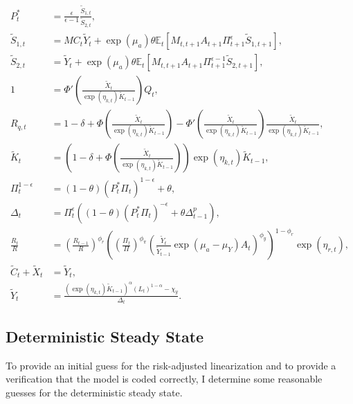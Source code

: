 \documentclass[12 pt, oneside]{article}
\theoremstyle{definition}
\theoremstyle{definition}
\theoremstyle{definition}
\newcommand{\E}{\mathbb{E}}
\begin{document}
\begin{align}
  P_t^* & = \frac{\epsilon}{\epsilon - 1}\frac{\tilde{S}_{1, t}}{\tilde{S}_{2, t}},\\
  \label{eq:numerator recursion eqm stat}
  \tilde{S}_{1, t} & = MC_t \tilde{Y}_t + \exp(\mu_a)\theta\E_t[M_{t, t + 1}A_{t + 1}\Pi_{t + 1}^\epsilon \tilde{S}_{1, t + 1}],\\
  \label{eq:denominator recursion eqm stat}
  \tilde{S}_{2, t} & = \tilde{Y}_t + \exp(\mu_a)\theta\E_t[M_{t, t + 1}A_{t + 1}\Pi_{t + 1}^{\epsilon - 1} \tilde{S}_{2, t + 1}],\\
  \label{eq:tobins q eqm stat}
  1 & = \Phi'\left(\frac{\tilde{X}_t}{\exp(\eta_{k, t})\tilde{K}_{t - 1}}\right) Q_t,\\
  \label{eq:Rq defn eqm stat}
  R_{q, t} & = 1 - \delta + \Phi\left(\frac{\tilde{X}_t}{\exp(\eta_{k, t})\tilde{K}_{t - 1}}\right) - \Phi'\left(\frac{\tilde{X}_t}{\exp(\eta_{k, t})\tilde{K}_{t - 1}}\right)\frac{\tilde{X}_t}{\exp(\eta_{k, t})\tilde{K}_{t - 1}},\\
  \label{eq:law of motion capital eqm stat}
  \tilde{K}_t & = \left(1 - \delta + \Phi\left(\frac{\tilde{X}_t}{\exp(\eta_{k, t})\tilde{K}_{t - 1}}\right)\right)\exp(\eta_{k, t})\tilde{K}_{t - 1},\\
  \label{eq:inflation from optimal reset price eqm stat}
  \Pi_t^{ 1 - \epsilon} & = (1 - \theta) (P_t^*\Pi_t)^{1 - \epsilon} + \theta,\\
  \label{eq:price dispersion evol eqm stat}
  \Delta_t & = \Pi_t^{\epsilon}((1 - \theta) (P_t^* \Pi_t)^{-\epsilon} + \theta \Delta_{t - 1}^p),\\
  \label{eq:taylor rule eqm stat}
  \frac{R_t}{R} & =  \left(\frac{R_{t - 1}}{R}\right)^{\phi_r}\left(\left(\frac{\Pi_t}{\Pi}\right)^{\phi_\pi}\left(\frac{\tilde{Y}_t}{\tilde{Y}_{t - 1}} \exp(\mu_a - \mu_Y)A_t\right)^{\phi_y}\right)^{1 - \phi_r}\exp(\eta_{r, t}),\\
  \label{eq:output market clearing eqm stat}
  \tilde{C}_t + \tilde{X}_t & = \tilde{Y}_t,\\
  \label{eq:aggregate supply eqm stat}
  \tilde{Y}_t & = \frac{(\exp(\eta_{k, t}) \tilde{K}_{t - 1})^{\alpha}(L_t)^{1 - \alpha} - \chi_y}{\Delta_t}.
\end{align}

\subsection{Deterministic Steady State}
To provide an initial guess for the risk-adjusted linearization and to provide a verification that the model is coded correctly, I determine some reasonable guesses for the deterministic steady state.
\end{document}
